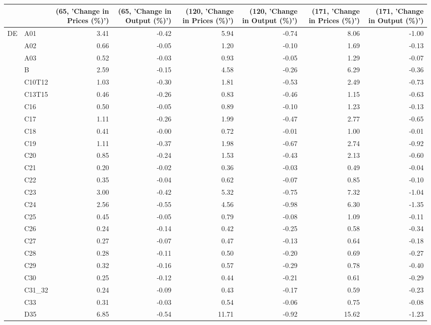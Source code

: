 \begin{tabular}{llrrrrrr}
\toprule
 &  & (65, 'Change in Prices (\%)') & (65, 'Change in Output (\%)') & (120, 'Change in Prices (\%)') & (120, 'Change in Output (\%)') & (171, 'Change in Prices (\%)') & (171, 'Change in Output (\%)') \\
\midrule
\multirow[t]{64}{*}{DE} & A01 & 3.41 & -0.42 & 5.94 & -0.74 & 8.06 & -1.00 \\
 & A02 & 0.66 & -0.05 & 1.20 & -0.10 & 1.69 & -0.13 \\
 & A03 & 0.52 & -0.03 & 0.93 & -0.05 & 1.29 & -0.07 \\
 & B & 2.59 & -0.15 & 4.58 & -0.26 & 6.29 & -0.36 \\
 & C10T12 & 1.03 & -0.30 & 1.81 & -0.53 & 2.49 & -0.73 \\
 & C13T15 & 0.46 & -0.26 & 0.83 & -0.46 & 1.15 & -0.63 \\
 & C16 & 0.50 & -0.05 & 0.89 & -0.10 & 1.23 & -0.13 \\
 & C17 & 1.11 & -0.26 & 1.99 & -0.47 & 2.77 & -0.65 \\
 & C18 & 0.41 & -0.00 & 0.72 & -0.01 & 1.00 & -0.01 \\
 & C19 & 1.11 & -0.37 & 1.98 & -0.67 & 2.74 & -0.92 \\
 & C20 & 0.85 & -0.24 & 1.53 & -0.43 & 2.13 & -0.60 \\
 & C21 & 0.20 & -0.02 & 0.36 & -0.03 & 0.49 & -0.04 \\
 & C22 & 0.35 & -0.04 & 0.62 & -0.07 & 0.85 & -0.10 \\
 & C23 & 3.00 & -0.42 & 5.32 & -0.75 & 7.32 & -1.04 \\
 & C24 & 2.56 & -0.55 & 4.56 & -0.98 & 6.30 & -1.35 \\
 & C25 & 0.45 & -0.05 & 0.79 & -0.08 & 1.09 & -0.11 \\
 & C26 & 0.24 & -0.14 & 0.42 & -0.25 & 0.58 & -0.34 \\
 & C27 & 0.27 & -0.07 & 0.47 & -0.13 & 0.64 & -0.18 \\
 & C28 & 0.28 & -0.11 & 0.50 & -0.20 & 0.69 & -0.27 \\
 & C29 & 0.32 & -0.16 & 0.57 & -0.29 & 0.78 & -0.40 \\
 & C30 & 0.25 & -0.12 & 0.44 & -0.21 & 0.61 & -0.29 \\
 & C31_32 & 0.24 & -0.09 & 0.43 & -0.17 & 0.59 & -0.23 \\
 & C33 & 0.31 & -0.03 & 0.54 & -0.06 & 0.75 & -0.08 \\
 & D35 & 6.85 & -0.54 & 11.71 & -0.92 & 15.62 & -1.23 \\

\end{tabular}
